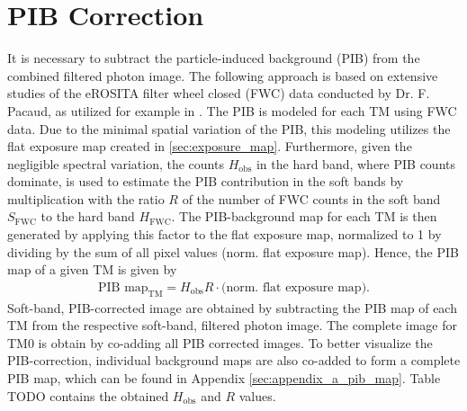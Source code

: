 \section{PIB Correction}
It is necessary to subtract the particle-induced background (PIB) from the combined filtered photon image. The following  approach is based on extensive studies of the eROSITA filter wheel closed (FWC) data conducted by Dr. F. Pacaud, as utilized for example in \cite{Reiprich2021}.  The PIB is modeled for each TM using FWC data. Due to the minimal spatial variation of the PIB, this modeling utilizes the flat exposure map created in \ref{sec:exposure_map}. Furthermore, given the negligible spectral variation, the counts \(H_\text{obs}\) in the hard band, where PIB counts dominate, is used to estimate the PIB contribution in the soft bands by multiplication with the ratio \(R\) of the number of FWC counts in the soft band \(S_{\text{FWC}}\) to the hard band \(H_\text{FWC}\). The PIB-background map for each TM is then generated by applying this factor to the flat exposure map, normalized to 1 by dividing by the sum of all pixel values (norm. flat exposure map). Hence, the PIB map of a given TM is given by
\begin{align*}
    \text{PIB map}_\text{TM} = H_\text{obs}R\cdot\bigl(\text{norm. flat exposure map}\bigr).
\end{align*}
Soft-band, PIB-corrected image are obtained by subtracting the PIB map of each TM from the respective soft-band, filtered photon image. The complete image for TM0 is obtain by co-adding all PIB corrected images. To better visualize the PIB-correction, individual background maps are also co-added to form a complete PIB map, which can be found in Appendix \ref{sec:appendix_a_pib_map}. Table TODO contains the obtained \(H_\text{obs}\) and \(R\) values.
%
